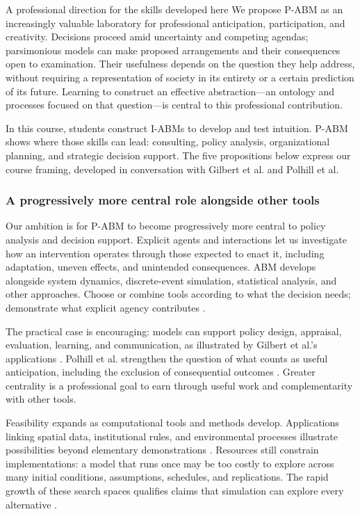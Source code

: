 \documentclass[11pt,a4paper]{article}
\begin{document}
\begin{principle}{A professional direction for the skills developed here}
We propose P-ABM as an increasingly valuable laboratory for professional anticipation, participation, and creativity. Decisions proceed amid uncertainty and competing agendas; parsimonious models can make proposed arrangements and their consequences open to examination. Their usefulness depends on the question they help address, without requiring a representation of society in its entirety or a certain prediction of its future. Learning to construct an effective abstraction---an ontology and processes focused on that question---is central to this professional contribution.

In this course, students construct I-ABMs to develop and test intuition. P-ABM shows where those skills can lead: consulting, policy analysis, organizational planning, and strategic decision support. The five propositions below express our course framing, developed in conversation with Gilbert et al. and Polhill et al.
\end{principle}

\subsubsection{A progressively more central role alongside other tools}

Our ambition is for P-ABM to become progressively more central to policy analysis and decision support. Explicit agents and interactions let us investigate how an intervention operates through those expected to enact it, including adaptation, uneven effects, and unintended consequences. ABM develops alongside system dynamics, discrete-event simulation, statistical analysis, and other approaches. Choose or combine tools according to what the decision needs; demonstrate what explicit agency contributes \cite{axtell_why_2000-1}.

The practical case is encouraging: models can support policy design, appraisal, evaluation, learning, and communication, as illustrated by Gilbert et al.'s applications \cite[paras.~2.2--2.11, sec.~4]{gilbert_policy_2018}. Polhill et al. strengthen the question of what counts as useful anticipation, including the exclusion of consequential outcomes \cite[paras.~1.5--1.7, 2.6--2.8]{polhill_prediction_2021}. Greater centrality is a professional goal to earn through useful work and complementarity with other tools.

Feasibility expands as computational tools and methods develop. Applications linking spatial data, institutional rules, and environmental processes illustrate possibilities beyond elementary demonstrations \cite[sec.~4]{gilbert_policy_2018}. Resources still constrain implementations: a model that runs once may be too costly to explore across many initial conditions, assumptions, schedules, and replications. The rapid growth of these search spaces qualifies claims that simulation can explore every alternative \cite[paras.~2.12, 2.23--2.24, 2.29--2.31]{polhill_prediction_2021}.
\end{document}
